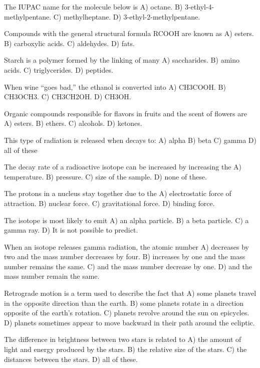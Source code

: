 The IUPAC name for the molecule below is
    A)  octane.
    B)  3-ethyl-4-methylpentane.
    C)  methylheptane.
    D)  3-ethyl-2-methylpentane.

Compounds with the general structural formula RCOOH are known as
    A)  esters.
    B)  carboxylic acids.
    C)  aldehydes.
    D)  fats.

Starch is a polymer formed by the linking of many
    A)  saccharides.
    B)  amino acids.
    C)  triglycerides.
    D)  peptides.

When wine ``goes bad,'' the ethanol is converted into
    A)  CH3COOH.
    B)  CH3OCH3.
    C)  CH3CH2OH.
    D)  CH3OH.

Organic compounds responsible for flavors in fruits and the scent of flowers are
    A)  esters.
    B)  ethers.
    C)  alcohols.
    D)  ketones.

This type of radiation is released when decays to:
    A)  alpha
    B)  beta
    C)  gamma
    D)  all of these

The decay rate of a radioactive isotope can be increased by increasing the
    A)  temperature.
    B)  pressure.
    C)  size of the sample.
    D)  none of these.

The protons in a nucleus stay together due to the
    A)  electrostatic force of attraction.
    B)  nuclear force.
    C)  gravitational force.
    D)  binding force.

The isotope is most likely to emit
    A)  an alpha particle.
    B)  a beta particle.
    C)  a gamma ray.
    D)  It is not possible to predict.

When an isotope releases gamma radiation, the atomic number
    A)  decreases by two and the mass number decreases by four.
    B)  increases by one and the mass number remains the same.
    C)  and the mass number decrease by one.
    D)  and the mass number remain the same.

Retrograde motion is a term used to describe the fact that
    A)  some planets travel in the opposite direction than the earth.
    B)  some planets rotate in a direction opposite of the earth's rotation.
    C)  planets revolve around the sun on epicycles.
    D)  planets sometimes appear to move backward in their path around the ecliptic.

The difference in brightness between two stars is related to
    A)  the amount of light and energy produced by the stars.
    B)  the relative size of the stars.
    C)  the distances between the stars.
    D)  all of these.

